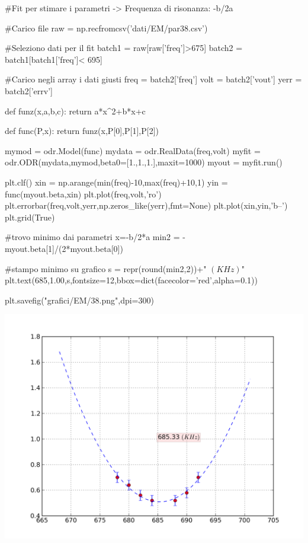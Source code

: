 \begin{sagesilent}
#Fit per stimare i parametri -> Frequenza di risonanza: -b/2a

#Carico file
raw = np.recfromcsv('dati/EM/par38.csv')

#Seleziono dati per il fit
batch1 = raw[raw['freq']>675]
batch2 = batch1[batch1['freq']< 695]

#Carico negli array i dati giusti
freq = batch2['freq']
volt = batch2['vout']
yerr = batch2['errv']


def funz(x,a,b,c):
    return a*x^2+b*x+c

def func(P,x):
    return funz(x,P[0],P[1],P[2])

mymod = odr.Model(func)
mydata = odr.RealData(freq,volt)
myfit = odr.ODR(mydata,mymod,beta0=[1.,1.,1.],maxit=1000)
myout = myfit.run()

plt.clf()
xin = np.arange(min(freq)-10,max(freq)+10,1)
yin = func(myout.beta,xin)
plt.plot(freq,volt,'ro')
plt.errorbar(freq,volt,yerr,np.zeros_like(yerr),fmt=None)
plt.plot(xin,yin,'b--')
plt.grid(True)

#trovo minimo dai parametri x=-b/2*a
min2 = -myout.beta[1]/(2*myout.beta[0]) 

#stampo minimo su grafico
s = repr(round(min2,2))+" $(KHz)$"
plt.text(685,1.00,s,fontsize=12,bbox=dict(facecolor='red',alpha=0.1))

plt.savefig("grafici/EM/38.png",dpi=300)

\end{sagesilent}

\includegraphics[scale=0.75]{grafici/EM/38.png}

